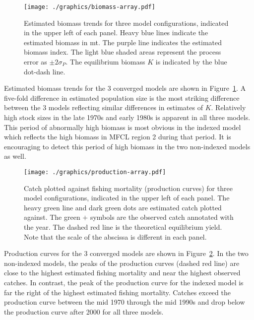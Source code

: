 \documentclass[12pt,letterpaper,twoside]{article}
\begin{document}
\begin{figure}
\begin{center}
\texttt{[image: ./graphics/biomass-array.pdf]}
\caption{\label{fig:estbiomass}
Estimated biomass trends for three model configurations, indicated in
the upper left of each panel.
Heavy blue lines indicate the estimated biomass in mt.
The purple line indicates the estimated biomass index.
The light blue shaded areas represent the process error as 
$\pm 2\sigma_P$.
The equilibrium biomass $K$ is indicated by the blue dot-dash line.
}
\end{center}
\end{figure}

Estimated biomass trends for the 3 converged models are shown in
Figure~\ref{fig:estbiomass}.
A five-fold difference in estimated population size is the
most striking difference between the 3 models reflecting similar
differences in estimates of $K$.
Relatively high stock sizes in the late 1970s and early 1980s is
apparent in all three models. 
This period of abnormally high biomass is most obvious in the indexed model
which reflects the high biomass in MFCL region 2 during that period.
It is encouraging to
detect this period of high biomass in the two non-indexed models as well.

\begin{figure}
\begin{center}
\texttt{[image: ./graphics/production-array.pdf]}
\caption{\label{fig:estprod}
Catch plotted against fishing mortality (production curves)
for three model configurations, 
indicated in the upper left of each panel.
The heavy green line and dark green dots are estimated catch plotted
against.
The green $+$ symbols are the observed catch annotated with the year.
The dashed red line is the theoretical equilibrium yield.
Note that the scale of the abscissa is different in each panel.
}
\end{center}
\end{figure}

Production curves for the 3 converged models are shown in
Figure~\ref{fig:estprod}.
In the two non-indexed models, the peaks of the production curves
(dashed red line) are close to the highest estimated fishing mortality
and near the highest observed catches. 
In contrast, the peak of the production curve for the indexed model is
far the right of the highest estimated fishing mortality.
Catches exceed the production curve between the mid 1970 through the
mid 1990s and drop below the production curve after 2000 for all three
models.
\end{document}
